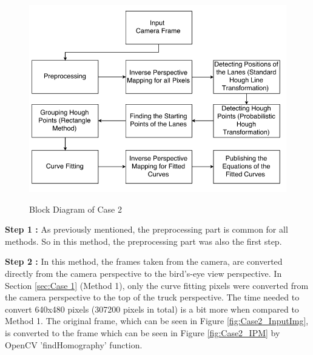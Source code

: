 \begin{figure}[H]
 \centering
  \includegraphics[width=1\textwidth]{./Bilder/Case2_BlockDiagram.png}\label{fig:Case2_BlockDiagram}
	\caption{Block Diagram of Case 2}
\end{figure}

\textbf{Step 1 : }As previously mentioned, the preprocessing part is common for all methods. So in this method, the preprocessing part was also the first step.

\textbf{Step 2 : }In this method, the frames taken from the camera, are converted directly from the camera perspective to the bird's-eye view perspective. In Section \ref{sec:Case 1} (Method 1), only the curve fitting pixels were converted from the camera perspective to the top of the truck perspective. The time needed to convert 640x480 pixels (307200 pixels in total) is a bit more when compared to Method 1. The original frame, which can be seen in Figure \ref{fig:Case2_InputImg}, is converted to the frame which can be seen in Figure \ref{fig:Case2_IPM} by OpenCV 'findHomography' function.

